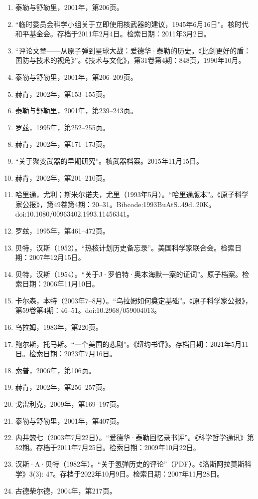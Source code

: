\begin{enumerate}
\item 泰勒与舒勒里，2001年，第206页。
\item “临时委员会科学小组关于立即使用核武器的建议，1945年6月16日”。核时代和平基金会。存档于2011年2月4日。检索日期：2011年3月2日。
\item “评论文章——从原子弹到星球大战：爱德华·泰勒的历史。《比剑更好的盾：国防与技术的视角》”。《技术与文化》，第31卷第4期：848页，1990年10月。
\item 泰勒与舒勒里，2001年，第206–209页。
\item 赫肯，2002年，第153–155页。
\item 泰勒与舒勒里，2001年，第239–243页。
\item 罗兹，1995年，第252–255页。
\item 赫肯，2002年，第171–173页。
\item “关于聚变武器的早期研究”。核武器档案。2015年11月15日。
\item 赫肯，2002年，第201–210页。
\item 哈里通，尤利；斯米尔诺夫，尤里（1993年5月）。“哈里通版本”。《原子科学家公报》，第49卷第4期：20–31。Bibcode:1993BuAtS..49d..20K。doi:10.1080/00963402.1993.11456341。
\item 罗兹，1995年，第461–472页。
\item 贝特，汉斯（1952）。“热核计划历史备忘录”。美国科学家联合会。检索日期：2007年12月15日。
\item 贝特，汉斯（1954）。“关于J·罗伯特·奥本海默一案的证词”。原子档案。检索日期：2006年11月10日。
\item 卡尔森，本特（2003年7–8月）。“乌拉姆如何奠定基础”。《原子科学家公报》，第59卷第4期：46–51。doi:10.2968/059004013。
\item 乌拉姆，1983年，第220页。
\item 鲍尔斯，托马斯。“一个美国的悲剧”。《纽约书评》。存档日期：2021年5月11日。检索日期：2023年7月16日。
\item 索普，2006年，第106页。
\item 赫肯，2002年，第256–257页。
\item 戈雷利克，2009年，第169–197页。
\item 泰勒与舒勒里，2001年，第407页。
\item 内井惣七（2003年7月22日）。“爱德华·泰勒回忆录书评”。《科学哲学通讯》第52期。存档于2011年7月25日。检索日期：2009年10月22日。
\item 汉斯·A·贝特（1982年）。“关于氢弹历史的评论”（PDF）。《洛斯阿拉莫斯科学》3(3): 47。存档于2022年10月9日。检索日期：2007年11月28日。
\item 古德柴尔德，2004年，第217页。

\end{enumerate}
